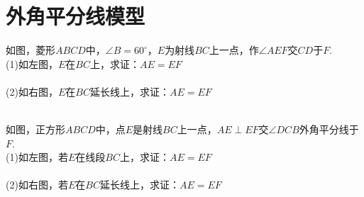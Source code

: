 \section{外角平分线模型}
\begin{example}
    如图，菱形$ABCD$中，$\angle B=60^\circ$，$E$为射线$BC$上一点，作$\angle AEF$交$CD$于$F$. \\
    (1)如左图，$E$在$BC$上，求证：$AE=EF$ \\
    \\
    (2)如右图，$E$在$BC$延长线上，求证：$AE=EF$ \\
    \\
\end{example}
\begin{figure}[H]
    \begin{minipage}{0.48\linewidth}
        \resizebox{4cm}{!}{}
    \end{minipage}
    \begin{minipage}{0.48\linewidth}
        \resizebox{4cm}{!}{}
    \end{minipage}
\end{figure}
\begin{example}
    如图，正方形$ABCD$中，点$E$是射线$BC$上一点，$AE\perp EF$交$\angle DCB$外角平分线于$F$. \\
    (1)如左图，若$E$在线段$BC$上，求证：$AE=EF$ \\
    \\
    (2)如右图，若$E$在$BC$延长线上，求证：$AE=EF$ \\
    \\
\end{example}
\begin{figure}[H]
    \begin{minipage}{0.48\linewidth}
        \resizebox{4cm}{!}{}
    \end{minipage}
    \begin{minipage}{0.48\linewidth}
        \resizebox{4cm}{!}{}
    \end{minipage}
\end{figure}

\clearpage
